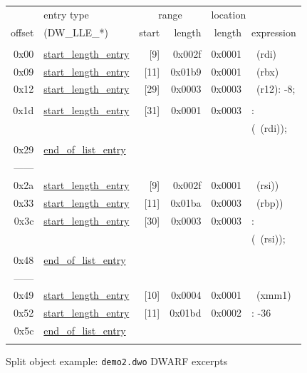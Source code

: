 \newcommand{\XXLLEsl}{\hyperlink{chap:DWLLEstartlengthentry}{start\_length\_entry}
                      \index{DW\_LLE\_start\_length\_entry}}
\newcommand{\XXLLEeol}{\hyperlink{chap:DWLLEendoflistentry}{end\_of\_list\_entry}
                       \index{DW\_LLE\_end\_of\_list\_entry}}

\begin{figure}[ht]
\begin{dwflisting}
\begin{tabular}{rl|rr|rl}
       &  entry type          & \multicolumn{2}{c}{range} 
                                               & \multicolumn{2}{l}{\hspace{6mm}location} \\
offset & (DW\_LLE\_*)         & start & length & length & expression \\
\hline
&&&&& \\

0x00 & \XXLLEsl &  [9] & 0x002f & 0x0001 & \DWOPregfive~(rdi) \\
0x09 & \XXLLEsl & [11] & 0x01b9 & 0x0001 & \DWOPregthree~(rbx) \\
0x12 & \XXLLEsl & [29] & 0x0003 & 0x0003 & \DWOPbregtwelve~(r12): -8;\\
     &          &      &        &        & \DWOPstackvalue \\
0x1d & \XXLLEsl & [31] & 0x0001 & 0x0003 & \DWOPentryvalue: \\
     &          &      &        &        & (\DWOPregfive~(rdi)); \\
     &          &      &        &        & \DWOPstackvalue \\
0x29 & \XXLLEeol &&&& \\
------ &&&&& \\

0x2a & \XXLLEsl &  [9] & 0x002f & 0x0001 & \DWOPregfour~(rsi)) \\
0x33 & \XXLLEsl & [11] & 0x01ba & 0x0003 & \DWOPregsix~(rbp)) \\
0x3c & \XXLLEsl & [30] & 0x0003 & 0x0003 & \DWOPentryvalue: \\
     &          &      &        &        & (\DWOPregfour~(rsi)); \\
     &          &      &        &        & \DWOPstackvalue \\
0x48 & \XXLLEeol &&&& \\
------ &&&&& \\

0x49 & \XXLLEsl & [10] & 0x0004 & 0x0001 & \DWOPregeighteen~(xmm1) \\
0x52 & \XXLLEsl & [11] & 0x01bd & 0x0002 & \DWOPfbreg: -36 \\
0x5c & \XXLLEeol &&&& \\
&&&& \\
\end{tabular}
\end{dwflisting}
\caption{Split object example: \texttt{demo2.dwo} DWARF \dotdebuglocdwo{} excerpts}
\label{fig:splitobjectexampledemotwodwodwarfdebuglocdwoexcerpts}
\end{figure}

